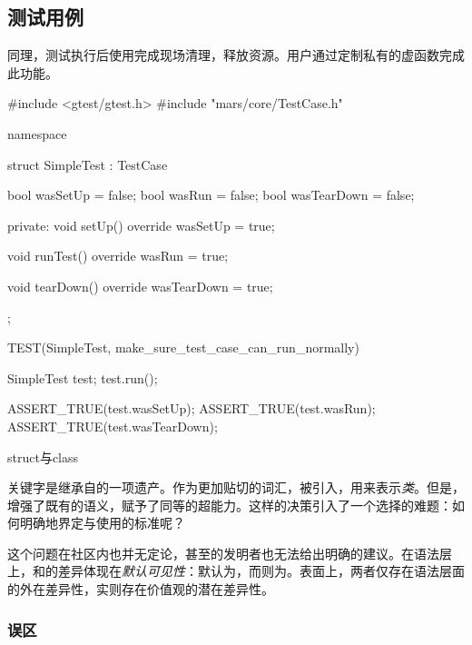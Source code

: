 \begin{content}

\subsection{测试用例}

同理，测试执行后使用完成现场清理，释放资源。用户通过定制私有的虚函数完成此功能。

\begin{leftbar}
 \begin{c++}[caption={\ttfamily{test/mars/core/TestCaseSpec.cc}}]
#include <gtest/gtest.h>
#include "mars/core/TestCase.h"

namespace {
  struct SimpleTest : TestCase {
    bool wasSetUp = false;
    bool wasRun = false;
    bool wasTearDown = false;

  private:
    void setUp() override {
      wasSetUp = true;
    }

    void runTest() override {
      wasRun = true;
    }

    void tearDown() override {
      wasTearDown = true;
    }
  };
}

TEST(SimpleTest, make_sure_test_case_can_run_normally) {
  SimpleTest test;
  test.run();

  ASSERT_TRUE(test.wasSetUp);
  ASSERT_TRUE(test.wasRun);
  ASSERT_TRUE(test.wasTearDown);  
}
 \end{c++}
\end{leftbar}

\begin{episode}{struct与class}
\begin{content}

关键字是\cpp{}继承自\clang{}的一项遗产。作为更加贴切的词汇，被引入\cpp{}，用来表示\emph{类}。但是，\cpp{}增强了既有的语义，赋予了同等的超能力。这样的决策引入了一个选择的难题：如何明确地界定与使用的标准呢？

这个问题在社区内也并无定论，甚至\cpp{}的发明者也无法给出明确的建议。在语法层上，和的差异体现在\emph{默认可见性}：默认为，而则为。表面上，两者仅存在语法层面的外在差异性，实则存在价值观的潜在差异性。

\subsubsection{误区}


\end{content}
\end{episode}
\end{content}
